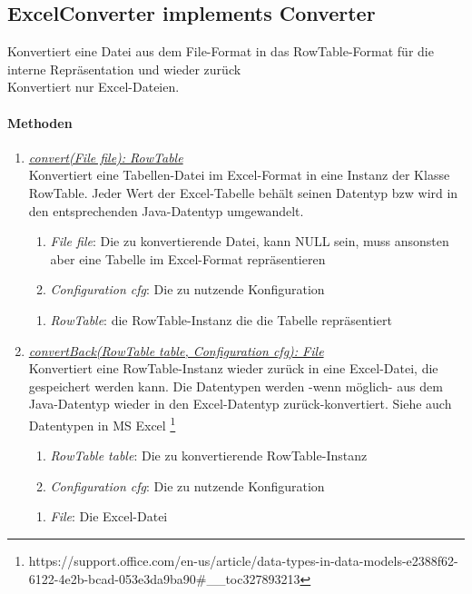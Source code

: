 \subsection*{ExcelConverter implements Converter}\label{excelConv}
Konvertiert eine Datei aus dem File-Format in das RowTable-Format für die interne Repräsentation und wieder zurück \\

Konvertiert nur Excel-Dateien. \\

\paragraph{Methoden}
\begin{enumerate}[+]
	\item \underline{\textit{convert(File file): RowTable}} \\
	Konvertiert eine Tabellen-Datei im Excel-Format in eine Instanz der Klasse RowTable.
	Jeder Wert der Excel-Tabelle behält seinen Datentyp bzw wird in den entsprechenden Java-Datentyp umgewandelt.
	
	\begin{enumerate}[$\bullet$]
		\item \textit{File file}: Die zu konvertierende Datei, kann NULL sein, muss ansonsten aber eine Tabelle im Excel-Format repräsentieren
		\item \textit{Configuration cfg}: Die zu nutzende Konfiguration
	\end{enumerate}
	\vspace{-0.2cm}
	\begin{enumerate}[$\circ$]
		\item \textit{RowTable}: die RowTable-Instanz die die Tabelle repräsentiert
	\end{enumerate}
	
	\item \underline{\textit{convertBack(RowTable table, Configuration cfg): File}} \\
	Konvertiert eine RowTable-Instanz wieder zurück in eine Excel-Datei, die gespeichert werden kann.
	Die Datentypen werden -wenn möglich- aus dem Java-Datentyp wieder in den Excel-Datentyp zurück-konvertiert.
	Siehe auch Datentypen in MS Excel 	\footnote{https://support.office.com/en-us/article/data-types-in-data-models-e2388f62-6122-4e2b-bcad-053e3da9ba90\#\_\_toc327893213}
	\begin{enumerate}[$\bullet$]
		\item \textit{RowTable table}: Die zu konvertierende RowTable-Instanz
		\item \textit{Configuration cfg}: Die zu nutzende Konfiguration
	\end{enumerate}
	\vspace{-0.2cm}
	\begin{enumerate}[$\circ$]
		\item \textit{File}: Die Excel-Datei
	\end{enumerate}
\end{enumerate}
